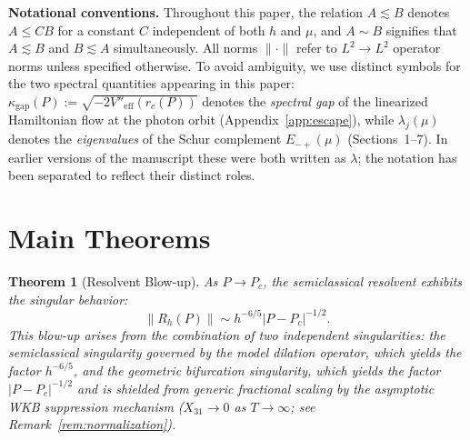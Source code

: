 \documentclass[12pt,a4paper]{amsart}
\newtheorem{theorem}{Theorem}[section]
\theoremstyle{remark}
\begin{document}
\medskip

\noindent
\textbf{Notational conventions.} Throughout this paper, the relation $A \lesssim B$
denotes $A \leq CB$ for a constant $C$ independent of both $h$ and $\mu$, and $A \sim B$
signifies that $A \lesssim B$ and $B \lesssim A$ simultaneously. All norms $\|\cdot\|$
refer to $L^2 \to L^2$ operator norms unless specified otherwise. To avoid ambiguity, we use distinct symbols for the two spectral quantities appearing
in this paper: $\kappa_{\mathrm{gap}}(P) := \sqrt{-2V''_{\mathrm{eff}}(r_c(P))}$ denotes
the \emph{spectral gap} of the linearized Hamiltonian flow at the photon orbit
(Appendix~\ref{app:escape}), while $\lambda_j(\mu)$ denotes the \emph{eigenvalues}
of the Schur complement $E_{-+}(\mu)$ (Sections~1--7). In earlier versions of the
manuscript these were both written as $\lambda$; the notation has been separated
to reflect their distinct roles.

\section{Main Theorems}

\begin{theorem}[Resolvent Blow-up]
\label{thm:resolvent}
As $P \to P_c$, the semiclassical resolvent exhibits the singular behavior:
\[
  \|R_h(P)\| \sim h^{-6/5}|P - P_c|^{-1/2}.
\]
This blow-up arises from the combination of two independent singularities: the semiclassical singularity
governed by the model dilation operator, which yields the factor $h^{-6/5}$, and the geometric bifurcation
singularity, which yields the factor $|P-P_c|^{-1/2}$ and is shielded from generic fractional scaling by the
asymptotic WKB suppression mechanism ($X_{31} \to 0$ as $T \to \infty$; see Remark~\ref{rem:normalization}).
\end{theorem}
\end{document}
